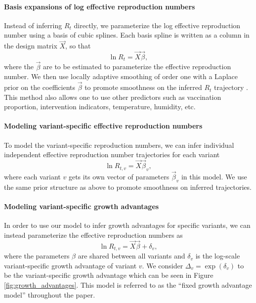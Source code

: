 \paragraph{Basis expansions of log effective reproduction numbers}%

Instead of inferring $R_{t}$ directly, we parameterize the log effective reproduction number using a basis of cubic splines.
Each basis spline is written as a column in the design matrix $\vec{X}$, so that
\begin{equation}
  \ln R_{t} = \vec{X} \vec{\beta},
\end{equation}
where the $\vec{\beta}$ are to be estimated to parameterize the effective reproduction number.
We then use locally adaptive smoothing of order one with a Laplace prior on the coefficients $\vec{\beta}$ to promote smoothness on the inferred $R_t$ trajectory \cite{Faulkner2018}.
This method also allows one to use other predictors such as vaccination proportion, intervention indicators, temperature, humidity, etc.



\paragraph{Modeling variant-specific effective reproduction numbers}%

To model the variant-specific reproduction numbers, we can infer individual independent effective reproduction number trajectories for each variant
\begin{equation}
  \ln R_{t, v} = \vec{X} \vec{\beta}_{v},
\end{equation}
where each variant $v$ gets its own vector of parameters $\vec{\beta}_{v}$ in this model.
We use the same prior structure as above to promote smoothness on inferred trajectories.

\paragraph{Modeling variant-specific growth advantages}%

In order to use our model to infer growth advantages for specific variants, we can instead parameterize the effective reproduction numbers as
\begin{equation}
\ln R_{t,v} = \vec{X} \vec{\beta} + \delta_{v},
\end{equation}
where the parameters $\beta$ are shared between all variants and $\delta_{v}$ is the log-scale variant-specific growth advantage of variant $v$.
We consider $\Delta_{v} = \exp(\delta_{v})$ to be the variant-specific growth advantage which can be seen in Figure \ref{fig:growth_advantages}.
This model is referred to as the ``fixed growth advantage model'' throughout the paper.

